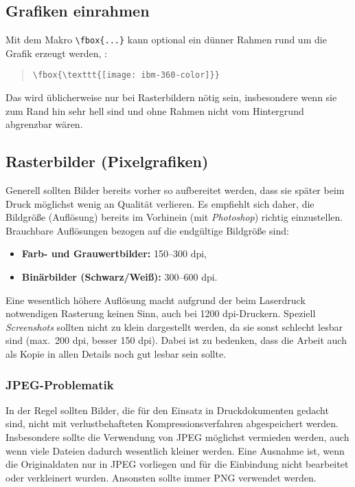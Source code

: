 \subsection{Grafiken einrahmen}

Mit dem Makro \verb!\fbox{...}! kann optional ein dünner Rahmen rund um die
Grafik erzeugt werden, \zB:
%
\begin{quote}
	\verb!\fbox{\texttt{[image: ibm-360-color]}}!
\end{quote}
%
Das wird üblicherweise nur bei Rasterbildern nötig sein, insbesondere wenn
sie zum Rand hin sehr hell sind und ohne Rahmen nicht vom Hintergrund
abgrenzbar wären.

\subsection{Rasterbilder (Pixelgrafiken)}

Generell sollten Bilder bereits vorher so aufbereitet werden, dass sie später
beim Druck möglichst wenig an Qualität verlieren. Es empfiehlt sich daher,
die Bildgröße (Auflösung) bereits im Vorhinein (\zB mit \emph{Photoshop})
richtig einzustellen.
Brauchbare Auflösungen bezogen auf die endgültige Bildgröße sind:
%
\begin{itemize}
  \item \textbf{Farb- und Grauwertbilder:} 150--300 dpi,
  \item \textbf{Binärbilder (Schwarz/Weiß):} 300--600 dpi.
\end{itemize}
%
Eine wesentlich höhere Auflösung macht aufgrund der beim Laserdruck
notwendigen Rasterung keinen Sinn, auch bei 1200 dpi-Druckern. Speziell
\emph{Screen\-shots} sollten nicht zu klein dargestellt werden, da sie sonst
schlecht lesbar sind (max.\ 200 dpi, besser 150 dpi). Dabei ist zu bedenken,
dass die Arbeit auch als Kopie in allen Details noch gut lesbar sein sollte.

\subsubsection{JPEG-Problematik}

In der Regel sollten Bilder, die für den Einsatz in Druckdokumenten gedacht
sind, nicht mit verlustbehafteten Kompressionsverfahren abgespeichert werden.
Insbesondere sollte die Verwendung von JPEG möglichst vermieden werden, auch
wenn viele Dateien dadurch wesentlich kleiner werden.
Eine Ausnahme ist, wenn die Originaldaten nur in JPEG vorliegen und für die 
Einbindung nicht bearbeitet oder verkleinert wurden. Ansonsten sollte immer
PNG verwendet werden.


